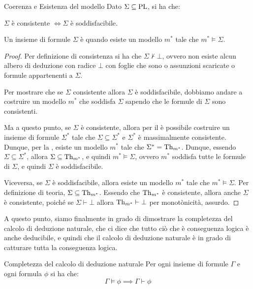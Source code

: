 \begin{theorem}[namedlabel={thm:coherence_and_model-existence}{Coerenza e Esistenza del modello}]{Coerenza e Esistenza del modello}
  Dato \(\Sigma\subseteq\operatorname{PL}\), si ha che:
  
  \(\Sigma\) è consistente \(\iff\Sigma\) è soddisfacibile.
\end{theorem}

Un insieme di formule \(\Sigma\) è  quando esiste un modello \(m^*\) tale che \(m^*\models\Sigma\).

\begin{proof}
  Per definizione di consistenza si ha che \(\Sigma \not\vdash \bot\), ovvero non esiste alcun albero di deduzione con radice \(\bot\) con foglie che sono o assunzioni scaricate o formule appartenenti a \(\Sigma\).

  Per mostrare che se \(\Sigma\) consistente allora \(\Sigma\) è soddisfacibile, dobbiamo andare a costruire un modello \(m^*\) che soddisfa \(\Sigma\) sapendo che le formule di \(\Sigma\) sono consistenti.

  Ma a questo punto, se \(\Sigma\) è consistente, allora per il  è possibile costruire un insieme di formule \(\Sigma^*\) tale che \(\Sigma\subseteq\Sigma^*\) e \(\Sigma^*\) è massimalmente consistente.
  Dunque, per la , esiste un modello \(m^*\) tale che \(\Sigma^* = \operatorname{Th}_{m^*}\). Dunque, essendo \(\Sigma\subseteq\Sigma^*\), allora \(\Sigma\subseteq\operatorname{Th}_{m^*}\), e quindi \(m^*\models\Sigma\), ovvero \(m^*\) soddisfa tutte le formule di \(\Sigma\), e quindi \(\Sigma\) è soddisfacibile.

  Viceversa, se \(\Sigma\) è soddisfacibile, allora esiste un modello \(m^*\) tale che \(m^*\models\Sigma\). Per definizione di teoria, \(\Sigma\subseteq\operatorname{Th}_{m^*}\).
  Essendo che \(\operatorname{Th}_{m^*}\) è consistente, allora anche \(\Sigma\) è consistente, poiché se \(\Sigma\vdash\bot\) allora \(\operatorname{Th}_{m^*}\vdash\bot\) per monotònicità, assurdo.
\end{proof}

A questo punto, siamo finalmente in grado di dimostrare la completezza del calcolo di deduzione naturale, che ci dice che tutto ciò che è conseguenza logica è anche deducibile, e quindi che il calcolo di deduzione naturale è in grado di catturare tutta la conseguenza logica.

\begin{theorem}{Completezza del calcolo di deduzione naturale}
  Per ogni insieme di formule \(\Gamma\) e ogni formula \(\phi\) si ha che:
  \[\Gamma \models \phi \implies \Gamma \vdash \phi\]
\end{theorem}

